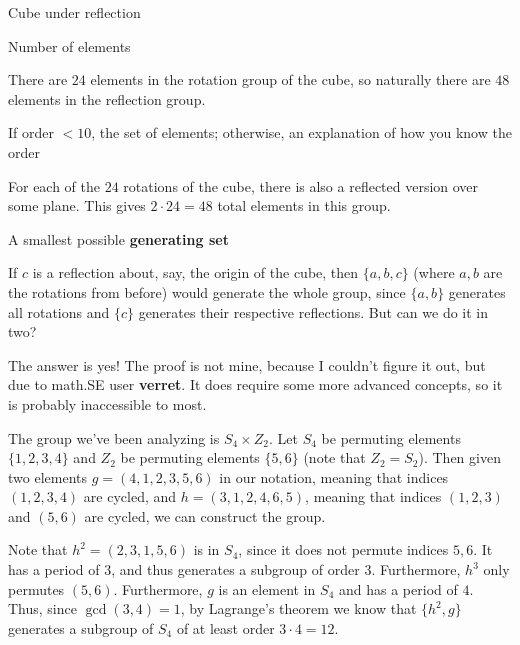\documentclass[../key.tex]{subfiles}
\begin{document}
\begin{outer_problem}
\item Cube under reflection
\end{outer_problem}

\begin{inner_problem}[start=1]
\item Number of elements
\end{inner_problem}

\noindent There are $24$ elements in the rotation group of the cube, so naturally there are $48$ elements in the reflection group.

\begin{inner_problem}
\item If order $< 10$, the set of elements; otherwise, an explanation of how you know the order
\end{inner_problem}

\noindent For each of the $24$ rotations of the cube, there is also a reflected version over some plane. This gives $2\cdot 24=48$ total elements in this group.

\begin{inner_problem}
\item A smallest possible \textbf{generating set}
\end{inner_problem}

\noindent If $c$ is a reflection about, say, the origin of the cube, then $\{a,b,c\}$ (where $a,b$ are the rotations from before) would generate the whole group, since $\{a,b\}$ generates all rotations and $\{c\}$ generates their respective reflections. But can we do it in two?

The answer is yes! The proof is not mine, because I couldn't figure it out, but due to math.SE user \textbf{verret}. It does require some more advanced concepts, so it is probably inaccessible to most.

The group we've been analyzing is $S_4\times Z_2$. Let $S_4$ be permuting elements $\{1,2,3,4\}$ and $Z_2$ be permuting elements $\{5,6\}$ (note that $Z_2=S_2$). Then given two elements $g=(4,1,2,3,5,6)$ in our notation, meaning that indices $(1,2,3,4)$ are cycled, and $h=(3,1,2,4,6,5)$, meaning that indices $(1,2,3)$ and $(5,6)$ are cycled, we can construct the group.

Note that $h^2=(2,3,1,5,6)$ is in $S_4$, since it does not permute indices $5,6$. It has a period of $3$, and thus generates a subgroup of order $3$. Furthermore, $h^3$ only permutes $(5,6)$. Furthermore, $g$ is an element in $S_4$ and has a period of $4$. Thus, since $\gcd(3,4)=1$, by Lagrange's theorem we know that $\{h^2,g\}$ generates a subgroup of $S_4$ of at least order $3\cdot 4=12$.
\end{document}
